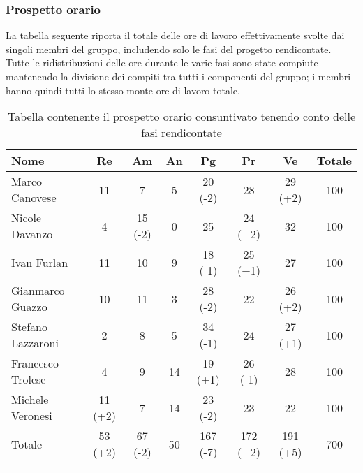 \subsubsection{Prospetto orario}
La tabella seguente riporta il totale delle ore di lavoro effettivamente svolte dai singoli membri del gruppo, includendo solo le fasi del progetto rendicontate. Tutte le ridistribuzioni delle ore durante le varie fasi sono state compiute mantenendo la divisione dei compiti tra tutti i componenti del gruppo; i membri hanno quindi tutti lo stesso monte ore di lavoro totale.

\begin{longtable}{|l|c|c|c|c|c|c|c|}
	\hline
	\rowcolor{lighter-grayer}
	\textbf{Nome}     & \textbf{Re} & \textbf{Am} & \textbf{An} & \textbf{Pg} & \textbf{Pr} & \textbf{Ve} & \textbf{Totale} \\
	\hline
	\endfirsthead

	\hline
	Marco Canovese    & 11          & 7           & 5           & 20 (-2)         & 28          & 29 (+2)         & 100             \\
	\hline
	\hline
	Nicole Davanzo    & 4           & 15 (-2)         & 0           & 25          & 24 (+2)         & 32          & 100             \\
	\hline
	\hline
	Ivan Furlan       & 11          & 10          & 9           & 18 (-1)         & 25 (+1)         & 27          & 100             \\
	\hline
	\hline
	Gianmarco Guazzo  & 10          & 11          & 3           & 28 (-2)         & 22          & 26 (+2)         & 100             \\
	\hline
	\hline
	Stefano Lazzaroni & 2           & 8           & 5           & 34 (-1)         & 24          & 27 (+1)         & 100             \\
	\hline
	\hline
	Francesco Trolese & 4           & 9           & 14          & 19 (+1)         & 26 (-1)         & 28          & 100             \\
	\hline
	\hline
	Michele Veronesi  & 11 (+2)         & 7           & 14          & 23 (-2)         & 23          & 22          & 100             \\
	\hline
	\hline
	Totale            & 53 (+2)         & 67 (-2)         & 50          & 167 (-7)        & 172 (+2)        & 191 (+5)        & 700             \\
	\hline
	\rowcolor{white}
	\caption{Tabella contenente il prospetto orario consuntivato tenendo conto delle fasi rendicontate}
\end{longtable}

